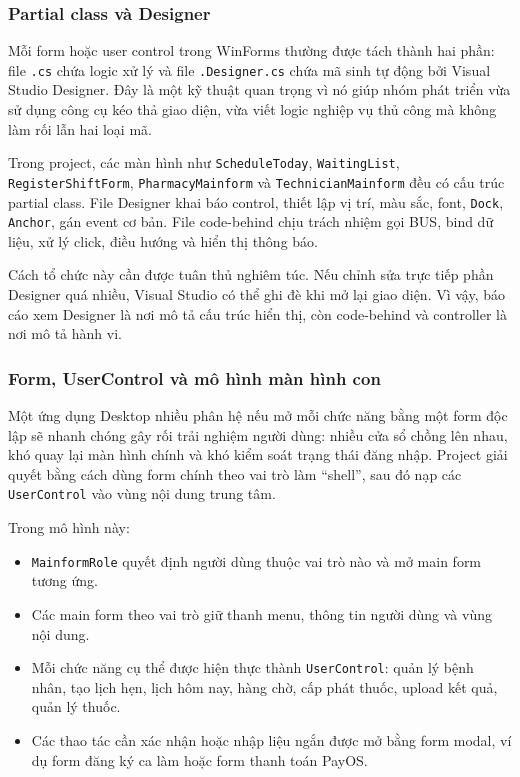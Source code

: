 \documentclass[12pt,a4paper]{article}
\numberwithin{figure}{subsection}
\numberwithin{table}{subsection}
\begin{document}
\subsubsection{Partial class và Designer}

Mỗi form hoặc user control trong WinForms thường được tách thành hai phần: file \texttt{.cs} chứa logic xử lý và file \texttt{.Designer.cs} chứa mã sinh tự động bởi Visual Studio Designer. Đây là một kỹ thuật quan trọng vì nó giúp nhóm phát triển vừa sử dụng công cụ kéo thả giao diện, vừa viết logic nghiệp vụ thủ công mà không làm rối lẫn hai loại mã.

Trong project, các màn hình như \texttt{ScheduleToday}, \texttt{WaitingList}, \texttt{RegisterShiftForm}, \texttt{PharmacyMainform} và \texttt{TechnicianMainform} đều có cấu trúc partial class. File Designer khai báo control, thiết lập vị trí, màu sắc, font, \texttt{Dock}, \texttt{Anchor}, gán event cơ bản. File code-behind chịu trách nhiệm gọi BUS, bind dữ liệu, xử lý click, điều hướng và hiển thị thông báo.

Cách tổ chức này cần được tuân thủ nghiêm túc. Nếu chỉnh sửa trực tiếp phần Designer quá nhiều, Visual Studio có thể ghi đè khi mở lại giao diện. Vì vậy, báo cáo xem Designer là nơi mô tả cấu trúc hiển thị, còn code-behind và controller là nơi mô tả hành vi.

\subsubsection{Form, UserControl và mô hình màn hình con}

Một ứng dụng Desktop nhiều phân hệ nếu mở mỗi chức năng bằng một form độc lập sẽ nhanh chóng gây rối trải nghiệm người dùng: nhiều cửa sổ chồng lên nhau, khó quay lại màn hình chính và khó kiểm soát trạng thái đăng nhập. Project giải quyết bằng cách dùng form chính theo vai trò làm ``shell'', sau đó nạp các \texttt{UserControl} vào vùng nội dung trung tâm.

Trong mô hình này:

\begin{itemize}
    \item \texttt{MainformRole} quyết định người dùng thuộc vai trò nào và mở main form tương ứng.
    \item Các main form theo vai trò giữ thanh menu, thông tin người dùng và vùng nội dung.
    \item Mỗi chức năng cụ thể được hiện thực thành \texttt{UserControl}: quản lý bệnh nhân, tạo lịch hẹn, lịch hôm nay, hàng chờ, cấp phát thuốc, upload kết quả, quản lý thuốc.
    \item Các thao tác cần xác nhận hoặc nhập liệu ngắn được mở bằng form modal, ví dụ form đăng ký ca làm hoặc form thanh toán PayOS.
\end{itemize}
\end{document}
